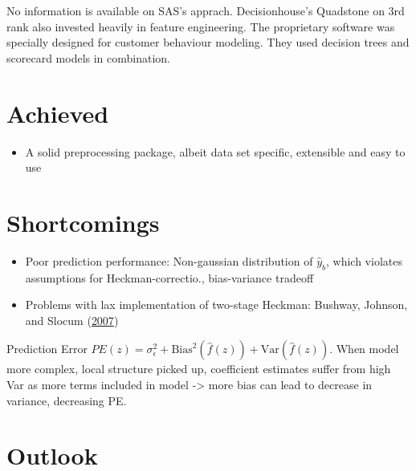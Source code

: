 \documentclass[
  11pt,
  a4paper,
  DIV=12,captions=tableheading,oneside,titlepage]{scrbook}
\providecommand{\tightlist}{%
  \setlength{\itemsep}{0pt}\setlength{\parskip}{0pt}}
\begin{document}
No information is available on SAS's apprach. Decisionhouse's Quadstone on 3rd rank also invested heavily in feature engineering. The proprietary software was specially designed for customer behaviour modeling. They used decision trees and scorecard models in combination.

\hypertarget{achieved}{%
\section{Achieved}\label{achieved}}

\begin{itemize}
\tightlist
\item
  A solid preprocessing package, albeit data set specific, extensible and easy to use
\end{itemize}

\hypertarget{shortcomings}{%
\section{Shortcomings}\label{shortcomings}}

\begin{itemize}
\item
  Poor prediction performance: Non-gaussian distribution of \(\hat{y}_b\), which violates assumptions for Heckman-correctio., bias-variance tradeoff
\item
  Problems with lax implementation of two-stage Heckman: Bushway, Johnson, and Slocum (\protect\hyperlink{ref-bushway2007magic}{2007})
\end{itemize}

Prediction Error \(PE(z) = \sigma_{\epsilon}^2+\text{Bias}^2(\hat{f}(z))+\text{Var}(\hat{f}(z))\). When model more complex, local structure picked up, coefficient estimates suffer from high Var as more terms included in model -\textgreater{} more bias can lead to decrease in variance, decreasing PE.

\hypertarget{outlook}{%
\section{Outlook}\label{outlook}}
\end{document}

